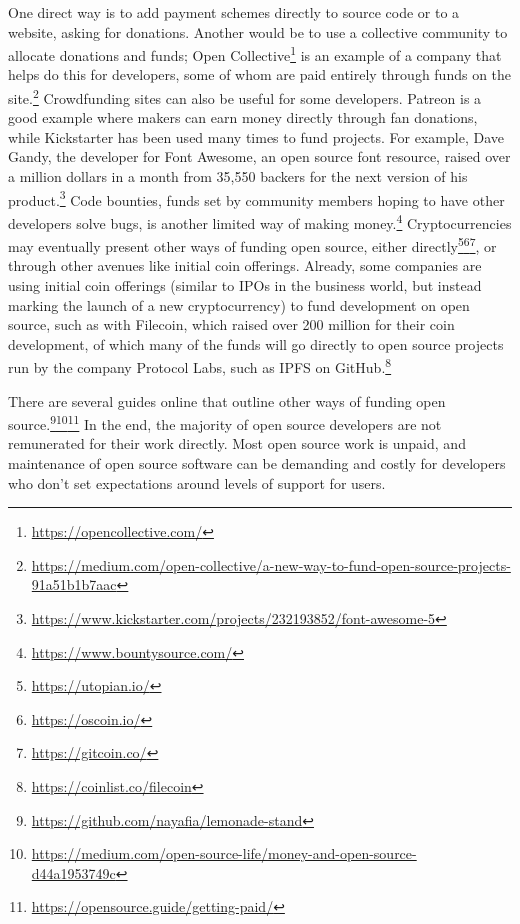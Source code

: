 One direct way is to add payment schemes directly to source code or to a website, asking for donations. Another would be to use a collective community to allocate donations and funds; Open Collective\footnote{\href{https://opencollective.com/}{https://opencollective.com/}} is an example of a company that helps do this for developers, some of whom are paid entirely through funds on the site.\footnote{\href{https://medium.com/open-collective/a-new-way-to-fund-open-source-projects-91a51b1b7aac}{https://medium.com/open-collective/a-new-way-to-fund-open-source-projects-91a51b1b7aac}} Crowdfunding sites can also be useful for some developers. Patreon is a good example where makers can earn money directly through fan donations, while Kickstarter has been used many times to fund projects. For example, Dave Gandy, the developer for Font Awesome, an open source font resource, raised over a million dollars in a month from 35,550 backers for the next version of his product.\footnote{\href{https://www.kickstarter.com/projects/232193852/font-awesome-5}{https://www.kickstarter.com/projects/232193852/font-awesome-5}} Code bounties, funds set by community members hoping to have other developers solve bugs, is another limited way of making money.\footnote{\href{https://www.bountysource.com/}{https://www.bountysource.com/}} Cryptocurrencies may eventually present other ways of funding open source, either directly\footnote{\href{https://utopian.io/}{https://utopian.io/}}\footnote{\href{https://oscoin.io/}{https://oscoin.io/}}\footnote{\href{https://gitcoin.co/}{https://gitcoin.co/}}, or through other avenues like initial coin offerings. Already, some companies are using initial coin offerings (similar to IPOs in the business world, but instead marking the launch of a new cryptocurrency) to fund development on open source, such as with Filecoin, which raised over 200 million for their coin development, of which many of the funds will go directly to open source projects run by the company Protocol Labs, such as IPFS \citep{benet2014ipfs} on GitHub.\footnote{\href{https://coinlist.co/filecoin}{https://coinlist.co/filecoin}}

There are several guides online that outline other ways of funding open source.\footnote{\href{https://github.com/nayafia/lemonade-stand}{https://github.com/nayafia/lemonade-stand}}\footnote{\href{https://medium.com/open-source-life/money-and-open-source-d44a1953749c}{https://medium.com/open-source-life/money-and-open-source-d44a1953749c}}\footnote{\href{https://opensource.guide/getting-paid/}{https://opensource.guide/getting-paid/}} In the end, the majority of open source developers are not remunerated for their work directly. Most open source work is unpaid, and maintenance of open source software can be demanding and costly for developers who don't set expectations around levels of support for users. 

